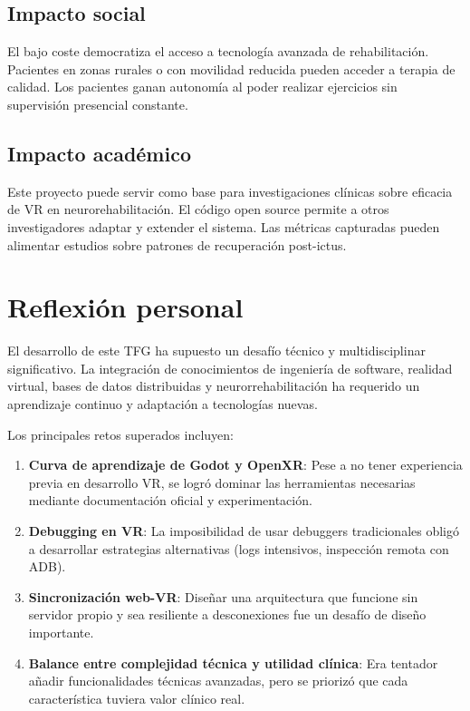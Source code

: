 \subsection{Impacto social}

El bajo coste democratiza el acceso a tecnología avanzada de rehabilitación. Pacientes en zonas rurales o con movilidad reducida pueden acceder a terapia de calidad. Los pacientes ganan autonomía al poder realizar ejercicios sin supervisión presencial constante.

\subsection{Impacto académico}

Este proyecto puede servir como base para investigaciones clínicas sobre eficacia de VR en neurorehabilitación. El código open source permite a otros investigadores adaptar y extender el sistema. Las métricas capturadas pueden alimentar estudios sobre patrones de recuperación post-ictus.

\section{Reflexión personal}

El desarrollo de este TFG ha supuesto un desafío técnico y multidisciplinar significativo. La integración de conocimientos de ingeniería de software, realidad virtual, bases de datos distribuidas y neurorrehabilitación ha requerido un aprendizaje continuo y adaptación a tecnologías nuevas.

Los principales retos superados incluyen:

\begin{enumerate}
    \item \textbf{Curva de aprendizaje de Godot y OpenXR}: Pese a no tener experiencia previa en desarrollo VR, se logró dominar las herramientas necesarias mediante documentación oficial y experimentación.
    
    \item \textbf{Debugging en VR}: La imposibilidad de usar debuggers tradicionales obligó a desarrollar estrategias alternativas (logs intensivos, inspección remota con ADB).
    
    \item \textbf{Sincronización web-VR}: Diseñar una arquitectura que funcione sin servidor propio y sea resiliente a desconexiones fue un desafío de diseño importante.
    
    \item \textbf{Balance entre complejidad técnica y utilidad clínica}: Era tentador añadir funcionalidades técnicas avanzadas, pero se priorizó que cada característica tuviera valor clínico real.
\end{enumerate}

